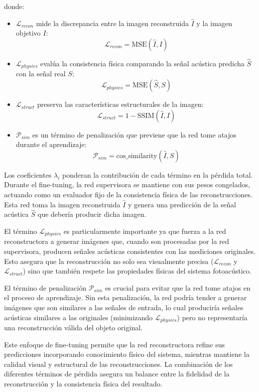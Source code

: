 donde:

\begin{itemize}
    \item $\mathcal{L}_{recon}$ mide la discrepancia entre la imagen reconstruida $\hat{I}$ y la imagen objetivo $I$:
    \begin{equation}
        \mathcal{L}_{recon} = \text{MSE}(\hat{I}, I)
    \end{equation}
    
    \item $\mathcal{L}_{physics}$ evalúa la consistencia física comparando la señal acústica predicha $\hat{S}$ con la señal real $S$:
    \begin{equation}
        \mathcal{L}_{physics} = \text{MSE}(\hat{S}, S)
    \end{equation}
    
    \item $\mathcal{L}_{struct}$ preserva las características estructurales de la imagen:
    \begin{equation}
        \mathcal{L}_{struct} = 1 - \text{SSIM}(\hat{I}, I)
    \end{equation}
    
    \item $\mathcal{P}_{sim}$ es un término de penalización que previene que la red tome atajos durante el aprendizaje:
    \begin{equation}
        \mathcal{P}_{sim} = \text{cos\_similarity}(\hat{I}, S)
    \end{equation}
\end{itemize}

Los coeficientes $\lambda_i$ ponderan la contribución de cada término en la pérdida total. Durante el fine-tuning, la red supervisora se mantiene con sus pesos congelados, actuando como un evaluador fijo de la consistencia física de las reconstrucciones. Esta red toma la imagen reconstruida $\hat{I}$ y genera una predicción de la señal acústica $\hat{S}$ que debería producir dicha imagen.

El término $\mathcal{L}_{physics}$ es particularmente importante ya que fuerza a la red reconstructora a generar imágenes que, cuando son procesadas por la red supervisora, producen señales acústicas consistentes con las mediciones originales. Esto asegura que la reconstrucción no solo sea visualmente precisa ($\mathcal{L}_{recon}$ y $\mathcal{L}_{struct}$) sino que también respete las propiedades físicas del sistema fotoacústico.

El término de penalización $\mathcal{P}_{sim}$ es crucial para evitar que la red tome atajos en el proceso de aprendizaje. Sin esta penalización, la red podría tender a generar imágenes que son similares a las señales de entrada, lo cual produciría señales acústicas similares a las originales (minimizando $\mathcal{L}_{physics}$) pero no representaría una reconstrucción válida del objeto original.

Este enfoque de fine-tuning permite que la red reconstructora refine sus predicciones incorporando conocimiento físico del sistema, mientras mantiene la calidad visual y estructural de las reconstrucciones. La combinación de los diferentes términos de pérdida asegura un balance entre la fidelidad de la reconstrucción y la consistencia física del resultado.
